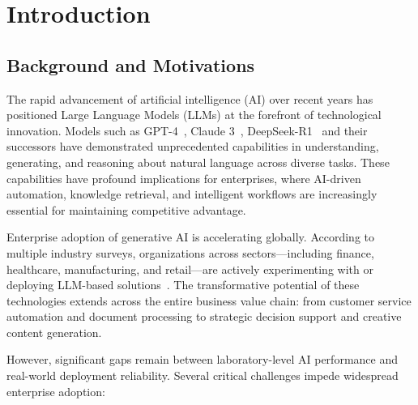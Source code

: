 \chapter{Introduction}
\label{ch:introduction}

\section{Background and Motivations}
\label{sec:background}

The rapid advancement of artificial intelligence (AI) over recent years has positioned Large Language Models (LLMs) at the forefront of technological innovation. Models such as GPT-4~\cite{achiam2023gpt4}, Claude 3~\cite{anthropic2024claude}, %
DeepSeek-R1~\cite{guo2025deepseek} and their successors have demonstrated unprecedented capabilities in understanding, generating, and reasoning about natural language across diverse tasks. These capabilities have profound implications for enterprises, where AI-driven automation, knowledge retrieval, and intelligent workflows are increasingly essential for maintaining competitive advantage.

Enterprise adoption of generative AI is accelerating globally. According to multiple industry surveys, organizations across sectors---including finance, healthcare, manufacturing, and retail---are actively experimenting with or deploying LLM-based solutions~\cite{mckinsey2024genai}. The transformative potential of these technologies extends across the entire business value chain: from customer service automation and document processing to strategic decision support and creative content generation.

However, significant gaps remain between laboratory-level AI performance and real-world deployment reliability. Several critical challenges impede widespread enterprise adoption:

